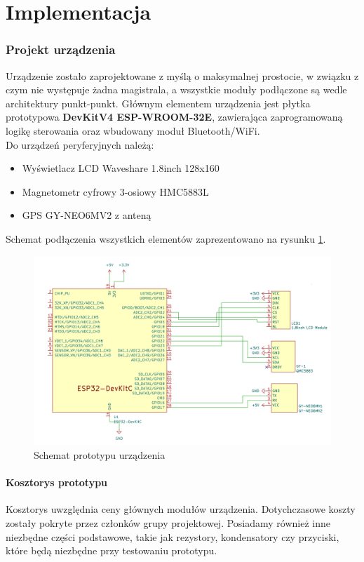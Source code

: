 \part{Implementacja}

\section{Projekt urządzenia}

Urządzenie zostało zaprojektowane z myślą o maksymalnej prostocie, w związku z czym nie występuje żadna magistrala, a wszystkie moduły podłączone są wedle architektury punkt-punkt. Głównym elementem urządzenia jest płytka prototypowa {\bf DevKitV4 ESP-WROOM-32E}, zawierająca zaprogramowaną logikę sterowania oraz wbudowany moduł Bluetooth/WiFi.\\

Do urządzeń peryferyjnych należą:
\begin{itemize}
    \item Wyświetlacz LCD Waveshare 1.8inch 128x160
    \item Magnetometr cyfrowy 3-osiowy HMC5883L
    \item GPS GY-NEO6MV2 z anteną
\end{itemize}

Schemat podłączenia wszystkich elementów zaprezentowano na rysunku \ref{fig:scheme:hardware}.

\begin{figure}[H]
    \centering
    \includegraphics[width=0.75\linewidth]{hardware_schematics.png}
    \caption{Schemat prototypu urządzenia}
    \label{fig:scheme:hardware}
\end{figure}

\subsection{Kosztorys prototypu}
Kosztorys uwzględnia ceny głównych modułów urządzenia. Dotychczasowe koszty zostały pokryte przez członków grupy projektowej. Posiadamy również inne niezbędne części podstawowe, takie jak rezystory, kondensatory czy przyciski, które będą niezbędne przy testowaniu prototypu.

